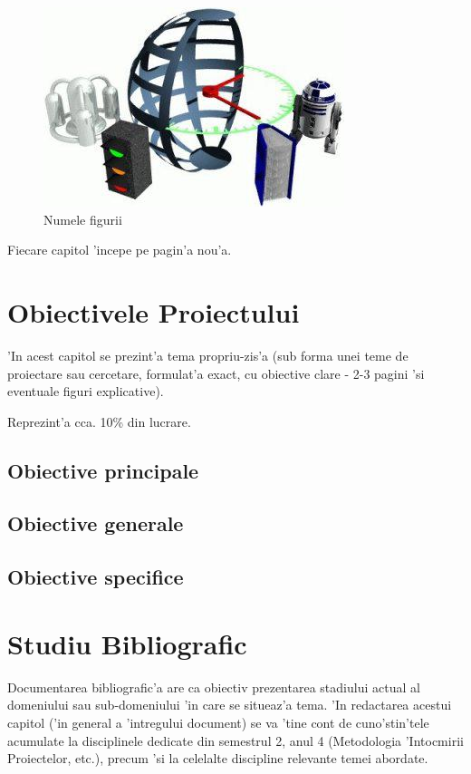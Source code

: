 \documentclass[12pt,a4paper,twoside]{report}
\begin{document}
\begin{figure}[ht]
    \centering
\includegraphics[]{img/test.jpg}
    \caption{Numele figurii}
    \label{fig:imag}
\end{figure}

Fiecare capitol 'incepe pe pagin'a nou'a.

\chapter{Obiectivele Proiectului}

'In acest capitol se prezint'a tema propriu-zis'a (sub forma unei teme de proiectare sau cercetare, formulat'a exact, cu obiective clare - 2-3 pagini 'si eventuale figuri explicative).

Reprezint'a cca. 10\% din lucrare.
\section{Obiective principale}
\section{Obiective generale}
\section{Obiective specifice}


\chapter{Studiu Bibliografic}

Documentarea bibliografic'a are ca obiectiv prezentarea stadiului actual al domeniului sau sub-domeniului 'in care se situeaz'a tema. 
'In redactarea acestui capitol ('in general a 'intregului document) se va 'tine cont de cuno'stin'tele acumulate la disciplinele dedicate din semestrul 2, anul 4 
(Metodologia 'Intocmirii Proiectelor, etc.), precum 'si la celelalte discipline relevante temei abordate.
\end{document}

